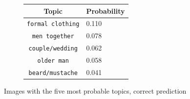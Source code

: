 \documentclass[twoside,twocolumn]{article}
\begin{document}
\begin{figure}
\begin{subfigure}{\textwidth}
\begin{minipage}[t][4cm]{.5\linewidth}
    \end{minipage}\hfill
    \begin{minipage}[t]{.5\textwidth}
    \centering
    \vspace{0pt}
    \begin{tabular}{cl}
            Topic                           & Probability\\
            \hline
            \texttt{formal clothing}             & 0.110 \\
            \texttt{men together}                   & 0.078 \\
            \texttt{couple/wedding}                 & 0.062 \\
            \texttt{older man}           & 0.058 \\
            \texttt{beard/mustache}        & 0.041\\
            \hline
        \end{tabular}
    \end{minipage}
\end{subfigure}
\caption{Images with the five most probable topics, correct prediction}
\label{fig:predcorrect}
\end{figure}
\end{document}
